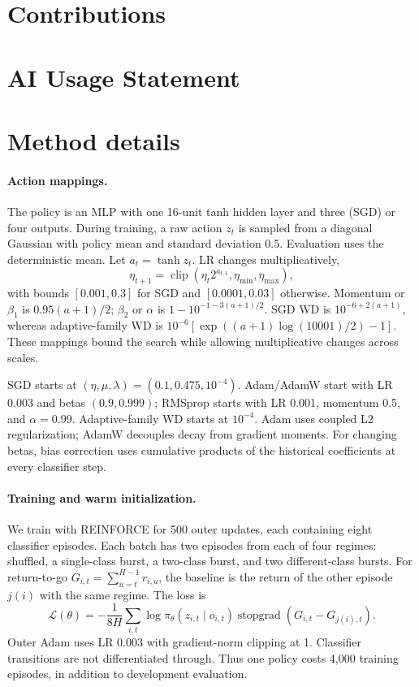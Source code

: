 \documentclass{article}
\begin{document}
\section*{Contributions}

\section*{AI Usage Statement}

\printbibliography

\appendix
\section{Method details}\label{app:method}
\paragraph{Action mappings.}
The policy is an MLP with one 16-unit tanh hidden layer and three (SGD) or four outputs. During training, a raw action $z_t$ is sampled from a diagonal Gaussian with policy mean and standard deviation 0.5. Evaluation uses the deterministic mean. Let $a_t=\tanh z_t$. LR changes multiplicatively,
\begin{equation}
 \eta_{t+1}=\operatorname{clip}(\eta_t2^{a_{t,1}},\eta_{\min},\eta_{\max}),
\end{equation}
with bounds $[0.001,0.3]$ for SGD and $[0.0001,0.03]$ otherwise. Momentum or $\beta_1$ is $0.95(a+1)/2$; $\beta_2$ or $\alpha$ is $1-10^{-1-3(a+1)/2}$. SGD WD is $10^{-6+2(a+1)}$, whereas adaptive-family WD is $10^{-6}[\exp((a+1)\log(10001)/2)-1]$. These mappings bound the search while allowing multiplicative changes across scales.

SGD starts at $(\eta,\mu,\lambda)=(0.1,0.475,10^{-4})$. Adam/AdamW start with LR 0.003 and betas $(0.9,0.999)$; RMSprop starts with LR 0.001, momentum 0.5, and $\alpha=0.99$. Adaptive-family WD starts at $10^{-4}$. Adam uses coupled L2 regularization; AdamW decouples decay from gradient moments. For changing betas, bias correction uses cumulative products of the historical coefficients at every classifier step.

\paragraph{Training and warm initialization.}
We train with REINFORCE for 500 outer updates, each containing eight classifier episodes. Each batch has two episodes from each of four regimes: shuffled, a single-class burst, a two-class burst, and two different-class bursts. For return-to-go $G_{i,t}=\sum_{u=t}^{H-1}r_{i,u}$, the baseline is the return of the other episode $j(i)$ with the same regime. The loss is
\begin{equation}
 \mathcal{L}(\theta)=-\frac{1}{8H}\sum_{i,t}\log\pi_\theta(z_{i,t}\mid o_{i,t})
 \operatorname{stopgrad}(G_{i,t}-G_{j(i),t}).
\end{equation}
Outer Adam uses LR 0.003 with gradient-norm clipping at 1. Classifier transitions are not differentiated through. Thus one policy costs 4,000 training episodes, in addition to development evaluation.
\end{document}
